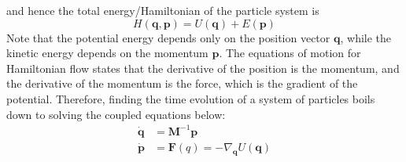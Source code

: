     and hence the total energy/Hamiltonian of the particle system is 
    \begin{equation}
      H(\mathbf{q}, \mathbf{p}) = U(\mathbf{q}) + E(\mathbf{p})
    \end{equation}
    Note that the potential energy depends only on the position vector $\mathbf{q}$, while the kinetic energy depends on the momentum $\mathbf{p}$. The equations of motion for Hamiltonian flow states that the derivative of the position is the momentum, and the derivative of the momentum is the force, which is the gradient of the potential. Therefore, finding the time evolution of a system of particles boils down to solving the coupled equations below: 
    \begin{align*}
      \boldsymbol{\dot{q}} & = \mathbf{M}^{-1} \mathbf{p} \\
      \boldsymbol{\dot{p}} & = \mathbf{F}(q) = - \nabla_\mathbf{q} U(\mathbf{q})
    \end{align*}

